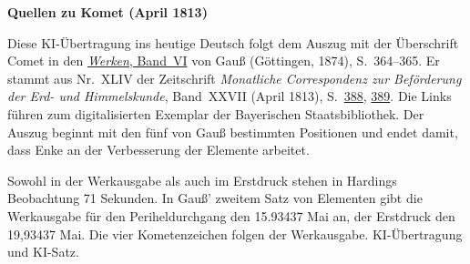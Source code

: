 \clearpage\thispagestyle{empty}
\begin{center}\textbf{Quellen zu Komet (April 1813)}\end{center}
\noindent Diese KI-Übertragung ins heutige Deutsch folgt dem Auszug mit der Überschrift Comet in den \href{https://gdz.sub.uni-goettingen.de/id/PPN236007467}{\textit{Werken}, Band~VI} von Gauß (Göttingen, 1874), S.~364--365. Er stammt aus Nr.~XLIV der Zeitschrift \textit{Monatliche Correspondenz zur Beförderung der Erd- und Himmelskunde}, Band~XXVII (April 1813), S.~\href{https://api.digitale-sammlungen.de/iiif/image/v2/bsb10538616_00402/full/1600,/0/default.jpg}{388}, \href{https://api.digitale-sammlungen.de/iiif/image/v2/bsb10538616_00403/full/1600,/0/default.jpg}{389}. Die Links führen zum digitalisierten Exemplar der Bayerischen Staatsbibliothek. Der Auszug beginnt mit den fünf von Gauß bestimmten Positionen und endet damit, dass Enke an der Verbesserung der Elemente arbeitet.
\par\smallskip\noindent Sowohl in der Werkausgabe als auch im Erstdruck stehen in Hardings Beobachtung 71 Sekunden. In Gauß’ zweitem Satz von Elementen gibt die Werkausgabe für den Periheldurchgang den 15.93437 Mai an, der Erstdruck den 19,93437 Mai. Die vier Kometenzeichen folgen der Werkausgabe. KI-Übertragung und KI-Satz.
\clearpage
